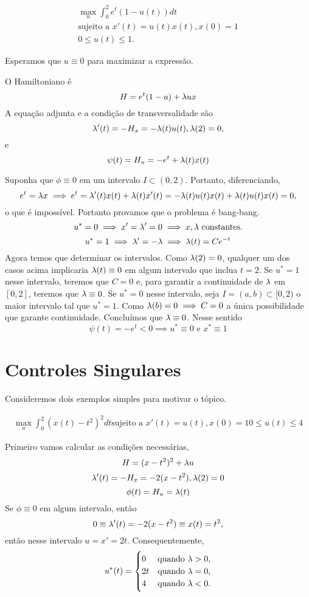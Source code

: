 \begin{example}
    \begin{gather*}
        \max_u \int_0^2 e^t(1 - u(t))dt \\ 
        \text{sujeito a  }x'(t) = u(t)x(t), x(0) = 1 \\
        0 \le u(t) \le 1.
    \end{gather*}

    Esperamos que $u \equiv 0$ para maximizar a expressão. 
\end{example}

O Hamiltoniano é 
$$
H = e^t(1 - u) + \lambda u x
$$
A equação adjunta e a condição de transversalidade são 
$$
\lambda '(t) = - H_x = - \lambda(t)u(t), \lambda(2) = 0,
$$
e
$$
\psi(t) = H_u = -e^t + \lambda(t)x(t)
$$

Suponha que $\phi \equiv 0$ em um intervalo $I \subset (0,2)$. Portanto,
diferenciando, 
$$
e^t = \lambda x \implies e^t = \lambda '(t)x(t) + \lambda(t) x'(t) = -\lambda(t)u(t)x(t) + \lambda(t)u(t)x(t) = 0,
$$
o que é impossível. Portanto provamos que o problema é bang-bang. 
$$
u^* = 0 \implies x' = \lambda ' = 0 \implies x, \lambda \text{ constantes.}
$$
$$
u^* = 1\implies \lambda' = -\lambda \implies \lambda(t) = Ce^{-t}
$$
Agora temos que determinar os intervalos. Como $\lambda(2) = 0$, qualquer um dos
casos acima implicaria $\lambda(t) \equiv 0$ em algum intervalo que inclua $t=2$. 
Se $u^* = 1$ nesse intervalo, teremos que $C = 0$ e, para garantir a
continuidade de $\lambda$ em $[0,2]$, teremos que $\lambda \equiv 0$. Se $u^* = 0$
nesse intervalo, seja $I = (a,b) \subset [0,2)$ o maior intervalo tal que $u^* =
1$. Como $\lambda(b) = 0 \implies C = 0$ a única possibilidade que garante
continuidade. Concluímos que $\lambda \equiv 0$. Nesse sentido 
$$
\psi(t) = -e^t < 0 \implies u^* \equiv 0 \text{ e }x^* \equiv 1
$$

\section{Controles Singulares}

Consideremos dois exemplos simples para motivar o tópico. 

\begin{example}
    \begin{gather*}
        \max_u \int_0^2 (x(t) - t^2)^2 dt
        \text{sujeito a  }x'(t) = u(t), x(0) = 1
        0 \leq u(t) \leq 4
    \end{gather*}
\end{example}

Primeiro vamos calcular as condições necessárias, 
$$
H = (x - t^2)^2 + \lambda u 
$$
$$
\lambda '(t) = -H_x = -2(x - t^2), \lambda(2) = 0
$$
$$
\phi(t) = H_u = \lambda(t)
$$
Se $\phi \equiv 0$ em algum intervalo, então 
$$
0 \equiv \lambda '(t) = -2(x - t^2) \equiv x(t) =  t^2,
$$
então nesse intervalo $u = x' = 2t$.
Consequentemente, 
$$
u^*(t) = \begin{cases}
    0 &\text{quando }\lambda > 0, \\
    2t &\text{quando }\lambda = 0, \\
    4 &\text{quando }\lambda < 0.
\end{cases}
$$

